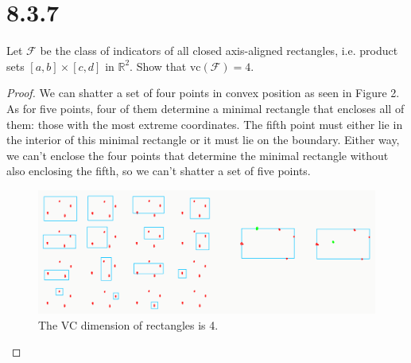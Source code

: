 \documentclass[11pt,letterpaper]{report}
\newcommand{\reals}{\mathbb{R}}
\newcommand{\mcal}[1]{\mathcal{#1}}
\newcommand{\vc}{\text{vc}}
\begin{document}
\section*{8.3.7}
Let $\mcal{F}$ be the class of indicators of all closed axis-aligned rectangles, i.e. product sets $[a,b]\times [c,d]$ in $\reals^2$. Show that $\vc(\mcal{F}) = 4$.
\begin{proof}
	We can shatter a set of four points in convex position as seen in Figure 2. As for five points, four of them determine a minimal rectangle that encloses all of them: those with the most extreme coordinates. The fifth point must either lie in the interior of this minimal rectangle or it must lie on the boundary. Either way, we can't enclose the four points that determine the minimal rectangle without also enclosing the fifth, so we can't shatter a set of five points.

	\begin{figure}[ht]\label{rectangles}
	\centering
		\includegraphics[scale=.4]{rectangles.PNG}	
		\caption{The VC dimension of rectangles is 4.}
	\end{figure}
\end{proof}
\end{document}
